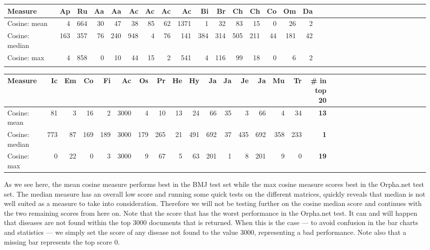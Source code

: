 \begin{table}[H]
\begin{tiny}
  \begin{tabular}{|l|r|r|r|r|r|r|r|r|r|r|r|r|r|r|r|r|r|r|r|r|r|r|r|r|r|r|r|r|r|r|r|}
    \hline
    Measure &Ap&Ru&Aa&Aa&Ac&Ac&Ac&Ac&Bi&Br&Ch&Ch&Co&Om&Da\\
    \hline
    Cosine: mean & 4 & 664 & 30 & 47 & 38 & 85 & 62 & 1371 & 1 & 32 & 83 & 15 & 0 & 26 & 2 \\
    \hline
    Cosine: median & 163 & 357 & 76 & 240 & 948 & 4 & 76 & 141 & 384 & 314 & 505 & 211 & 44 & 181 & 42 \\
    \hline
    Cosine: max & 4 & 858 & 0 & 10 & 44 & 15 & 2 & 541 & 4 & 116 & 99 & 18 & 0 & 6 & 2\\
    \hline
    \multicolumn{16}{c}{} \\
    \end{tabular}
    \begin{tabular}{|l|r|r|r|r|r|r|r|r|r|r|r|r|r|r|r|r|r|r|r|r|r|r|r|r|r|r|r|r|r|r|}
    \hline
     Measure &Ic&Em&Co&Fi&Ac&Os&Pr&He&Hy&Ja&Ja&Je&Ja&Mu&Tr &  \scriptsize{\textbf{\# in top 20}} \\
    \hline
     Cosine: mean & 81 & 3 & 16 & 2 & 3000 & 4 & 10 & 13 & 24 & 66 & 35 & 3 & 66 & 4 & 34 & \scriptsize{\textbf{13}} \\
    \hline
    Cosine: median & 773 & 87 & 169 & 189 & 3000 & 179 & 265 & 21 & 491 & 692 & 37 & 435 & 692 & 358 & 233 & \scriptsize{\textbf{1}} \\
    \hline
     Cosine: max  & 0 & 22 & 0 & 3 & 3000 & 9 & 67 & 5 & 63 & 201 & 1 & 8 & 201 & 9 & 0 & \scriptsize{\textbf{19}} \\
     \hline
  \end{tabular}
\end{tiny}
\end{table}

As we see here, the mean cosine measure performs best in the BMJ test
set while the max cosine measure scores best in the Orpha.net test
set. The median measure has an overall low score and running some
quick tests on the different matrices, quickly reveals that median is
not well suited as a measure to take into consideration. Therefore we
will not be testing further on the cosine median score and continues
with the two remaining scores from here on. Note that the score that
has the worst performance in the Orpha.net test. It can and will
happen that diseases are not found within the top 3000 documents that
is returned. When this is the case --- to avoid confusion in the bar
charts and statistics --- we simply set the score of any disease not
found to the value 3000, representing a bad performance. Note also
that a missing bar represents the top score 0. \\

